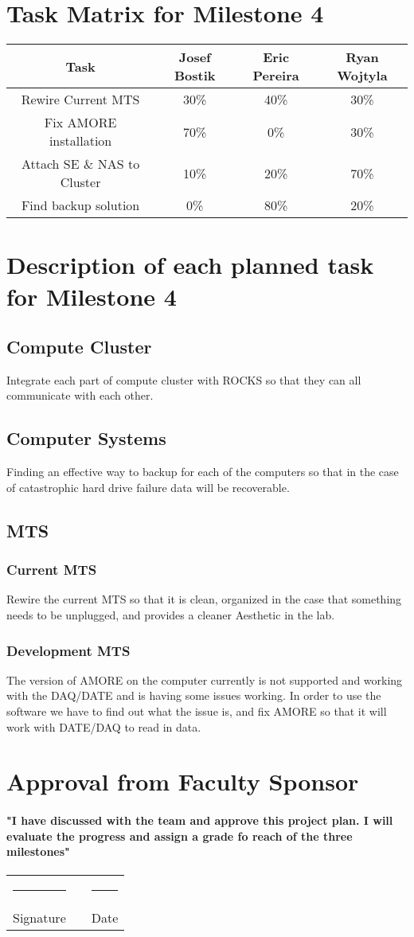 \documentclass[12pt]{article}
\newcommand\tab[1][1cm]{\hspace*{#1}}
\newcommand{\doubleSignature}[2]{
	\begin{center}
		
	\end{center}
	\vspace{2cm}
	
	\noindent
	\begin{tabular}{lcl}
		\rule{7cm}{1pt} & \hspace{2cm} & \rule{3cm}{1pt} \\
		#1 & & #2
	\end{tabular}
	\vspace{1cm}
}
\begin{document}
\section{Task Matrix for Milestone 4}
\begin{tabular}{| c | c | c | c |}
	\hline 
	Task & Josef Bostik & Eric Pereira & Ryan Wojtyla \\
	\hline 
	Rewire Current MTS & 30\% & 40\% & 30\% \\
	\hline 
	Fix AMORE installation & 70\% & 0\% & 30\% \\
	\hline
	Attach SE \& NAS to Cluster & 10\% & 20\% & 70\% \\
	\hline
	Find backup solution & 0\% & 80\% & 20\% \\
	\hline
	
\end{tabular}


\section{Description of each planned task for Milestone 4}
\subsection{Compute Cluster}
\tab Integrate each part of compute cluster with ROCKS so that they can all communicate with each other.
\subsection{Computer Systems}
\tab Finding an effective way to backup for each of the computers so that in the case of catastrophic hard drive failure data will be recoverable. 
\subsection{MTS}
\subsubsection{Current MTS}
\tab Rewire the current MTS so that it is clean, organized in the case that something needs to be unplugged, and provides a cleaner Aesthetic in the lab. 
\subsubsection{Development MTS}
\tab The version of AMORE on the computer currently is not supported and working with the DAQ/DATE and is having some issues working. In order to use the software we have to find out what the issue is, and fix AMORE so that it will work with DATE/DAQ to read in data. 

\section{Approval from Faculty Sponsor}
\paragraph{\tab "I have discussed with the team and approve this project plan. I will evaluate the progress and assign a grade fo reach of the three milestones"}
\doubleSignature{Signature}{Date}
\end{document}
